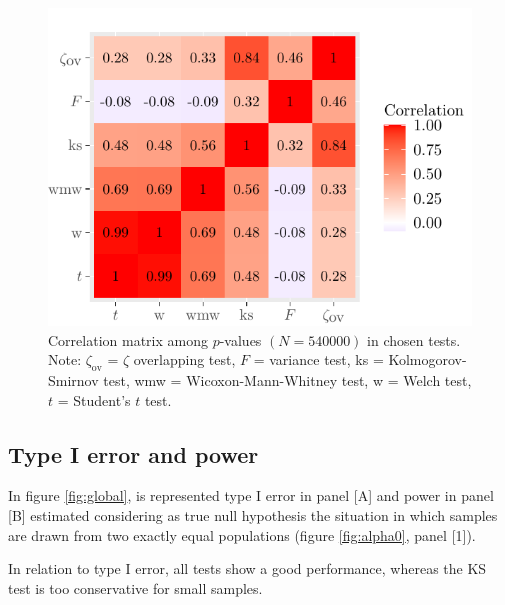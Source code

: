 \documentclass[twocolumn]{article}\usepackage[]{graphicx}\usepackage[]{xcolor}
\makeatletter
\def\maxwidth{ %
  \ifdim\Gin@nat@width>\linewidth
    \linewidth
  \else
    \Gin@nat@width
  \fi
}
\newenvironment{knitrout}{}{} %
\makeatother
\begin{document}
\begin{knitrout}
\color{fgcolor}\begin{figure}[!t]

{\centering \includegraphics[width=\maxwidth]{figure/correlazioni-1} 

}

\caption[Correlation matrix among $p$-values $(N = 540000)$ in chosen tests]{Correlation matrix among $p$-values $(N = 540000)$ in chosen tests. Note: $\zeta_{\mbox{ov}}$ = $\zeta$  overlapping test, $F$ = variance test, ks = Kolmogorov-Smirnov test, wmw = Wicoxon-Mann-Whitney test, w = Welch test, $t$ = Student's $t$ test.}\label{fig:correlazioni}
\end{figure}

\end{knitrout}


\subsection{Type I error and power}





In figure \ref{fig:global}, is represented type I error in panel [A] and power in panel [B] estimated considering as true null hypothesis the situation in which samples are drawn from two exactly equal populations (figure \ref{fig:alpha0}, panel [1]).

In relation to type I error, all tests show a good performance, whereas the KS test is too conservative for small samples. 
\end{document}
